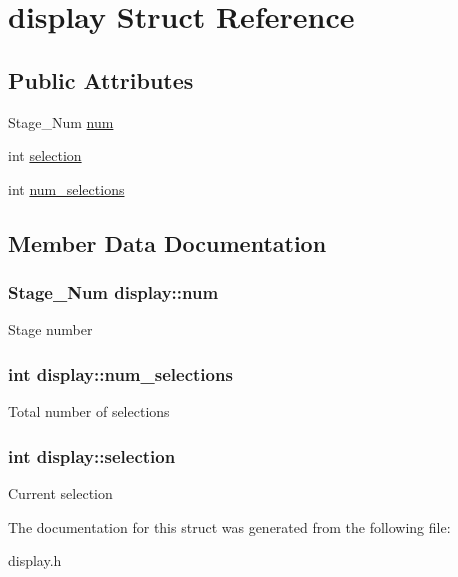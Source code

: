 \hypertarget{structdisplay}{\section{display Struct Reference}
\label{structdisplay}
}
\subsection*{Public Attributes}
\begin{DoxyCompactItemize}
\item 
Stage\+\_\+\+Num \hyperlink{structdisplay_a98085f9ee9540714ab2cc210334adf22}{num}
\item 
int \hyperlink{structdisplay_a9d60036308f837e2a643f866150b680f}{selection}
\item 
int \hyperlink{structdisplay_a344b6c61a47377cb86840cae1f5707bf}{num\+\_\+selections}
\end{DoxyCompactItemize}


\subsection{Member Data Documentation}
\hypertarget{structdisplay_a98085f9ee9540714ab2cc210334adf22}{
\subsubsection[{num}]{\setlength{\rightskip}{0pt plus 5cm}Stage\+\_\+\+Num display\+::num}}\label{structdisplay_a98085f9ee9540714ab2cc210334adf22}
Stage number \hypertarget{structdisplay_a344b6c61a47377cb86840cae1f5707bf}{
\subsubsection[{num\+\_\+selections}]{\setlength{\rightskip}{0pt plus 5cm}int display\+::num\+\_\+selections}}\label{structdisplay_a344b6c61a47377cb86840cae1f5707bf}
Total number of selections \hypertarget{structdisplay_a9d60036308f837e2a643f866150b680f}{
\subsubsection[{selection}]{\setlength{\rightskip}{0pt plus 5cm}int display\+::selection}}\label{structdisplay_a9d60036308f837e2a643f866150b680f}
Current selection 

The documentation for this struct was generated from the following file\+:\begin{DoxyCompactItemize}
\item 
display.\+h\end{DoxyCompactItemize}
